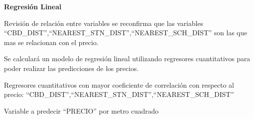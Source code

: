 \documentclass[
]{article}
\newenvironment{Shaded}{\begin{snugshade}}{\end{snugshade}}
\newcommand{\NormalTok}[1]{#1}
\newcommand{\OtherTok}[1]{\textcolor[rgb]{0.56,0.35,0.01}{#1}}
\newcommand{\SpecialCharTok}[1]{\textcolor[rgb]{0.00,0.00,0.00}{#1}}
\begin{document}
\textbf{Regresión Lineal}

Revisión de relación entre variables se reconfirma que las variables
``CBD\_DIST'',``NEAREST\_STN\_DIST'',``NEAREST\_SCH\_DIST'' son las que
mas se relacionan con el precio.

Se calculará un modelo de regresión lineal utilizando regresores
cuantitativos para poder realizar las predicciones de los precios.

Regresores cuantitativos con mayor coeficiente de correlación con
respecto al precio:
``CBD\_DIST'',``NEAREST\_STN\_DIST'',``NEAREST\_SCH\_DIST''

\begin{Shaded}
\end{Shaded}

Variable a predecir ``PRECIO'' por metro cuadrado

\begin{Shaded}
\end{Shaded}
\end{document}
